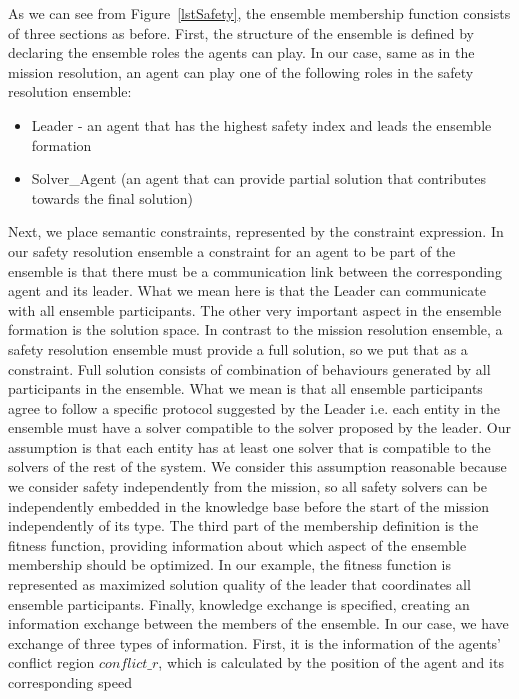 \documentclass[journal]{IEEEtran}
\theoremstyle{definition}
\newcommand\patrizio[1]{\nb{Patrizio}{#1}}
\begin{document}
As we can see from Figure~\ref{lstSafety},
the  ensemble  membership  function  consists  of  three  sections as before. First, the structure of the ensemble is defined by declaring the ensemble roles the agents can play. In  our  case, same as in the mission resolution, an  agent  can  play one  of  the  following  roles in the safety resolution ensemble:
\begin{itemize}
\item Leader - an agent that has the highest safety index and leads the ensemble formation
\item Solver\_Agent  (an  agent  that  can provide partial solution that contributes towards the final solution)
\end{itemize}
Next,  we  place  semantic  constraints,  represented  by  the constraint  expression.  In  our  safety resolution ensemble a  constraint  for  an agent  to  be  part of  the  ensemble  is  that  there  must  be  a communication  link between  the  corresponding  agent  and its  leader.  What  we  mean  here  is  that the Leader can communicate with all ensemble participants. The other very important aspect in the ensemble formation is the solution space. In contrast to the mission resolution ensemble, a safety resolution ensemble must provide a full solution, so we put that as a constraint. Full solution consists of combination of behaviours generated by all participants in the ensemble. What we mean is that all ensemble participants agree to follow a specific protocol suggested by the Leader i.e. each entity in the ensemble must have a solver compatible to the solver proposed by the leader. Our assumption is that each entity has at least one solver that is compatible to the solvers of the rest of the system. We consider this assumption reasonable because we consider safety independently from the mission, so 
all safety solvers can be independently embedded in the knowledge base before the start of the mission independently of its type.  
The third part of the membership definition  is  the  fitness  function, providing  information  about which  aspect  of  the  ensemble  membership  should  be  optimized. In  our  example,  the  fitness  function  is represented as maximized solution quality of the leader that coordinates all ensemble participants. 
Finally, knowledge exchange is specified, creating an information exchange between the members of the ensemble.  In  our  case,  we  have  exchange  of  three  types  of information.  First,  it is  the  information  of the agents' conflict region $conflict\_r$, which is calculated by the position of the agent and its corresponding speed 
\end{document}
